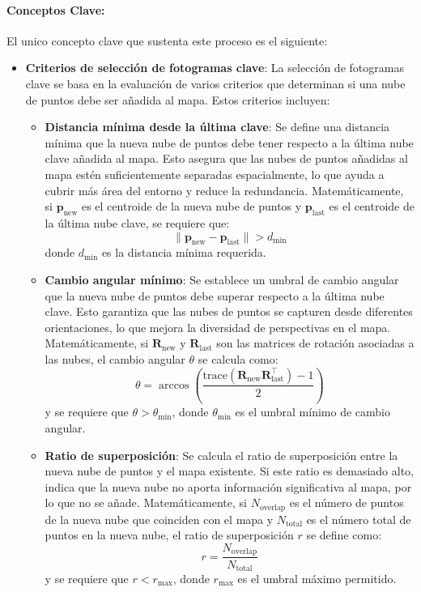 \documentclass[12pt, a4paper, twoside]{article}
\begin{document}
\paragraph{Conceptos Clave:}
El unico concepto clave que sustenta este proceso es el siguiente:
\begin{itemize}
  \item \textbf{Criterios de selección de fotogramas clave}: La selección de fotogramas clave se basa en la evaluación de varios criterios que determinan si una nube
  de puntos debe ser añadida al mapa. Estos criterios incluyen:
  \begin{itemize}
    \item \textbf{Distancia mínima desde la última clave}: Se define una distancia mínima que la nueva nube de puntos debe tener respecto a la última nube clave añadida al mapa.
      Esto asegura que las nubes de puntos añadidas al mapa estén suficientemente separadas espacialmente, lo que ayuda a cubrir más área del entorno y reduce la redundancia.
      Matemáticamente, si $\mathbf{p}_{\text{new}}$ es el centroide de la nueva nube de puntos y $\mathbf{p}_{\text{last}}$ es el centroide de la última nube clave, se requiere que:
      \[
      \|\mathbf{p}_{\text{new}} - \mathbf{p}_{\text{last}}\| > d_{\text{min}}
      \]
      donde $d_{\text{min}}$ es la distancia mínima requerida.
    \item \textbf{Cambio angular mínimo}: Se establece un umbral de cambio angular que la nueva nube de puntos debe superar respecto a la última nube clave. Esto garantiza que las 
      nubes de puntos se capturen desde diferentes orientaciones, lo que mejora la diversidad de perspectivas en el mapa.
      Matemáticamente, si $\mathbf{R}_{\text{new}}$ y $\mathbf{R}_{\text{last}}$ son las matrices de rotación asociadas a las nubes, el cambio angular $\theta$ se calcula como:
      \[
      \theta = \arccos\left(\frac{\text{trace}(\mathbf{R}_{\text{new}} \mathbf{R}_{\text{last}}^\top) - 1}{2}\right)
      \]
      y se requiere que $\theta > \theta_{\text{min}}$, donde $\theta_{\text{min}}$ es el umbral mínimo de cambio angular.
    \item \textbf{Ratio de superposición}: Se calcula el ratio de superposición entre la nueva nube de puntos y el mapa existente. Si este ratio es demasiado alto, indica que la nueva nube no aporta
      información significativa al mapa, por lo que no se añade.
      Matemáticamente, si $N_{\text{overlap}}$ es el número de puntos de la nueva nube que coinciden con el mapa y $N_{\text{total}}$ es el número total de puntos en la nueva nube, el ratio de superposición $r$ se define como:
      \[
      r = \frac{N_{\text{overlap}}}{N_{\text{total}}}
      \]
      y se requiere que $r < r_{\text{max}}$, donde $r_{\text{max}}$ es el umbral máximo permitido.
  \end{itemize}
\end{itemize}
\end{document}
